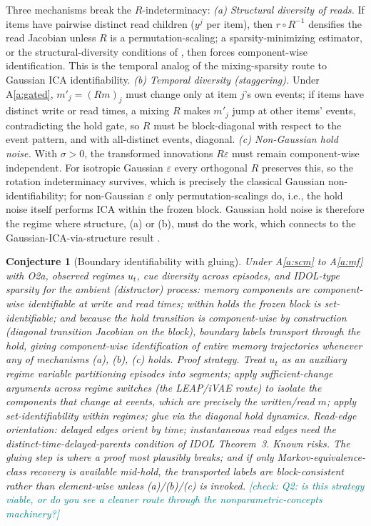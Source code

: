 \documentclass[11pt]{article}
\newcommand{\checkY}[1]{\textcolor{teal}{\footnotesize [check: #1]}}
\theoremstyle{plain}
\newtheorem{conjecture}{Conjecture}
\theoremstyle{definition}
\begin{document}
Three mechanisms break the $R$-indeterminacy:
\emph{(a) Structural diversity of reads.} If items have pairwise distinct read children ($y^j$ per item), then $r \circ R^{-1}$ densifies the read Jacobian unless $R$ is a permutation-scaling; a sparsity-minimizing estimator, or the structural-diversity conditions of \cite{zheng2022, zheng2025concepts}, then forces component-wise identification. This is the temporal analog of the mixing-sparsity route to Gaussian ICA identifiability.
\emph{(b) Temporal diversity (staggering).} Under A\ref{a:gated}, $m'_j = (Rm)_j$ must change only at item $j$'s own events; if items have distinct write or read times, a mixing $R$ makes $m'_j$ jump at other items' events, contradicting the hold gate, so $R$ must be block-diagonal with respect to the event pattern, and with all-distinct events, diagonal.
\emph{(c) Non-Gaussian hold noise.} With $\sigma > 0$, the transformed innovations $R\varepsilon$ must remain component-wise independent. For isotropic Gaussian $\varepsilon$ every orthogonal $R$ preserves this, so the rotation indeterminacy survives, which is precisely the classical Gaussian non-identifiability; for non-Gaussian $\varepsilon$ only permutation-scalings do, i.e., the hold noise itself performs ICA within the frozen block. Gaussian hold noise is therefore the regime where structure, (a) or (b), must do the work, which connects to the Gaussian-ICA-via-structure result \cite{zheng2022}.

\begin{conjecture}[Boundary identifiability with gluing]\label{conj:boundary}
Under A\ref{a:scm} to A\ref{a:mf} with O2a, observed regimes $u_t$, cue diversity across episodes, and IDOL-type sparsity for the ambient (distractor) process: memory components are component-wise identifiable at write and read times; within holds the frozen block is set-identifiable; and because the hold transition is component-wise by construction (diagonal transition Jacobian on the block), boundary labels transport through the hold, giving component-wise identification of entire memory trajectories whenever any of mechanisms (a), (b), (c) holds.
\emph{Proof strategy.} Treat $u_t$ as an auxiliary regime variable partitioning episodes into segments; apply sufficient-change arguments across regime switches (the LEAP/iVAE route) to isolate the components that change at events, which are precisely the written/read $m$; apply set-identifiability \cite{zheng2025concepts} within regimes; glue via the diagonal hold dynamics. Read-edge orientation: delayed edges orient by time; instantaneous read edges need the distinct-time-delayed-parents condition of IDOL Theorem~3.
\emph{Known risks.} The gluing step is where a proof most plausibly breaks; and if only Markov-equivalence-class recovery is available mid-hold, the transported labels are block-consistent rather than element-wise unless (a)/(b)/(c) is invoked. \checkY{Q2: is this strategy viable, or do you see a cleaner route through the nonparametric-concepts machinery?}
\end{conjecture}
\end{document}
